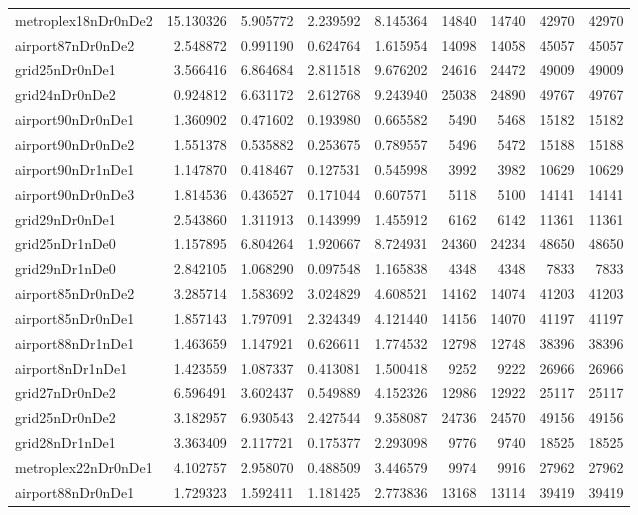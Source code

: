 \begin{longtable}{|l|r|r|r|r|r|r|r|r|}
metroplex18nDr0nDe2 & 15.130326 & 5.905772 & 2.239592 & 8.145364 & 14840 & 14740 & 42970 & 42970 \\
airport87nDr0nDe2 & 2.548872 & 0.991190 & 0.624764 & 1.615954 & 14098 & 14058 & 45057 & 45057 \\
grid25nDr0nDe1 & 3.566416 & 6.864684 & 2.811518 & 9.676202 & 24616 & 24472 & 49009 & 49009 \\
grid24nDr0nDe2 & 0.924812 & 6.631172 & 2.612768 & 9.243940 & 25038 & 24890 & 49767 & 49767 \\
airport90nDr0nDe1 & 1.360902 & 0.471602 & 0.193980 & 0.665582 & 5490 & 5468 & 15182 & 15182 \\
airport90nDr0nDe2 & 1.551378 & 0.535882 & 0.253675 & 0.789557 & 5496 & 5472 & 15188 & 15188 \\
airport90nDr1nDe1 & 1.147870 & 0.418467 & 0.127531 & 0.545998 & 3992 & 3982 & 10629 & 10629 \\
airport90nDr0nDe3 & 1.814536 & 0.436527 & 0.171044 & 0.607571 & 5118 & 5100 & 14141 & 14141 \\
grid29nDr0nDe1 & 2.543860 & 1.311913 & 0.143999 & 1.455912 & 6162 & 6142 & 11361 & 11361 \\
grid25nDr1nDe0 & 1.157895 & 6.804264 & 1.920667 & 8.724931 & 24360 & 24234 & 48650 & 48650 \\
grid29nDr1nDe0 & 2.842105 & 1.068290 & 0.097548 & 1.165838 & 4348 & 4348 & 7833 & 7833 \\
airport85nDr0nDe2 & 3.285714 & 1.583692 & 3.024829 & 4.608521 & 14162 & 14074 & 41203 & 41203 \\
airport85nDr0nDe1 & 1.857143 & 1.797091 & 2.324349 & 4.121440 & 14156 & 14070 & 41197 & 41197 \\
airport88nDr1nDe1 & 1.463659 & 1.147921 & 0.626611 & 1.774532 & 12798 & 12748 & 38396 & 38396 \\
airport8nDr1nDe1 & 1.423559 & 1.087337 & 0.413081 & 1.500418 & 9252 & 9222 & 26966 & 26966 \\
grid27nDr0nDe2 & 6.596491 & 3.602437 & 0.549889 & 4.152326 & 12986 & 12922 & 25117 & 25117 \\
grid25nDr0nDe2 & 3.182957 & 6.930543 & 2.427544 & 9.358087 & 24736 & 24570 & 49156 & 49156 \\
grid28nDr1nDe1 & 3.363409 & 2.117721 & 0.175377 & 2.293098 & 9776 & 9740 & 18525 & 18525 \\
metroplex22nDr0nDe1 & 4.102757 & 2.958070 & 0.488509 & 3.446579 & 9974 & 9916 & 27962 & 27962 \\
airport88nDr0nDe1 & 1.729323 & 1.592411 & 1.181425 & 2.773836 & 13168 & 13114 & 39419 & 39419 \\

\end{longtable}
